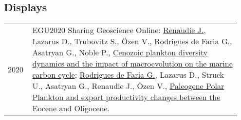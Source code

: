 \documentclass[11pt, a4paper]{article}
\begin{document}
\subsection{Displays}
\begin{longtable}{@{}p{0.1\linewidth} P{0.85\linewidth}@{}}
2020 & EGU2020 Sharing Geoscience Online: \underline{Renaudie J.}, Lazarus D., Trubovitz S., \"{O}zen V., Rodrigues de Faria G., Asatryan G., Noble P., \href{https://meetingorganizer.copernicus.org/EGU2020/EGU2020-3456.html}{Cenozoic plankton diversity dynamics and the impact of macroevolution on the marine carbon cycle}; \underline{Rodrigues de Faria G.}, Lazarus D., Struck U., Asatryan G., Renaudie J., \"{O}zen V., \href{https://meetingorganizer.copernicus.org/EGU2020/EGU2020-5924.html}{Paleogene Polar Plankton and export productivity changes between the Eocene and Oligocene}.\\
\end{longtable}
\end{document}
